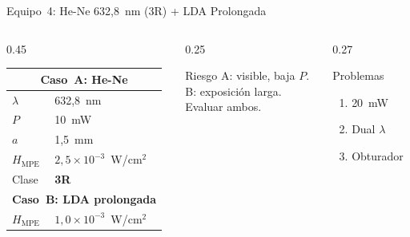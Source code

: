 \documentclass[aspectratio=169,12pt]{beamer}
\begin{document}
\begin{frame}{Equipo~4: He-Ne 632,8~nm (3R) + LDA Prolongada}
	\begin{columns}
		\begin{column}{0.45\textwidth}
			\centering\scriptsize
			\begin{tabular}{ll}
				\toprule
				\multicolumn{2}{c}{\textbf{Caso~A: He-Ne}}             \\
				\midrule
				$\lambda$          & 632,8~nm                          \\
				$P$                & 10~mW                             \\
				$a$                & 1,5~mm                            \\
				$H_{\mathrm{MPE}}$ & $2{,}5\!\times\!10^{-3}$~W/cm$^2$ \\
				\rowcolor{aeroyellow!20}
				Clase              & \textbf{3R}                       \\
				\midrule
				\multicolumn{2}{c}{\textbf{Caso~B: LDA prolongada}}    \\
				\midrule
				$H_{\mathrm{MPE}}$ & $1{,}0\!\times\!10^{-3}$~W/cm$^2$ \\
				\bottomrule
			\end{tabular}
		\end{column}
		\begin{column}{0.25\textwidth}
			\begin{alertblock}{\scriptsize Riesgo}
				\scriptsize
				A: visible, baja $P$.\\
				B: exposición larga.\\
				Evaluar ambos.
			\end{alertblock}
		\end{column}
		\begin{column}{0.27\textwidth}
			\begin{exampleblock}{\scriptsize Problemas}
				\scriptsize
				\begin{enumerate}
					\item[P4.1] 20~mW
					\item[P4.2] Dual $\lambda$
					\item[P4.3] Obturador
				\end{enumerate}
			\end{exampleblock}
		\end{column}
	\end{columns}
\end{frame}

\end{document}
